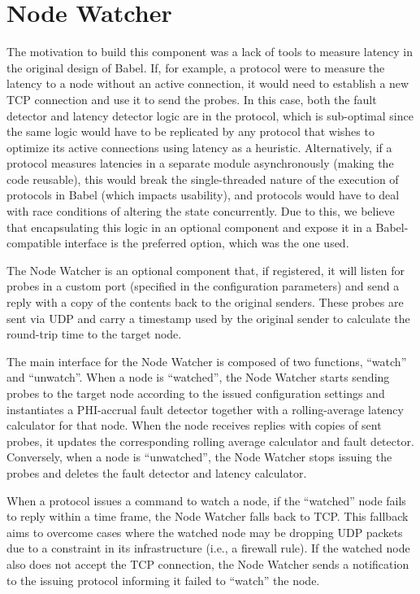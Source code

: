 \section{Node Watcher} \label{sec:Node-Watcher}

The motivation to build this component was a lack of tools to measure latency in the original design of Babel. If, for example, a protocol were to measure the latency to a node without an active connection, it would need to establish a new TCP connection and use it to send the probes. In this case, both the fault detector and latency detector logic are in the protocol, which is sub-optimal since the same logic would have to be replicated by any protocol that wishes to optimize its active connections using latency as a heuristic. Alternatively, if a protocol measures latencies in a separate module asynchronously (making the code reusable), this would break the single-threaded nature of the execution of protocols in Babel (which impacts usability), and protocols would have to deal with race conditions of altering the state concurrently. Due to this, we believe that encapsulating this logic in an optional component and expose it in a Babel-compatible interface is the preferred option, which was the one used.

The Node Watcher is an optional component that, if registered, it will listen for probes in a custom port (specified in the configuration parameters) and send a reply with a copy of the contents back to the original senders. These probes are sent via UDP and carry a timestamp used by the original sender to calculate the round-trip time to the target node.

The main interface for the Node Watcher is composed of two functions, ``watch'' and ``unwatch''. When a node is ``watched'', the Node Watcher starts sending probes to the target node according to the issued configuration settings and instantiates a PHI-accrual fault detector \cite{phi-accrual-fd} together with a rolling-average latency calculator for that node.  When the node receives replies with copies of sent probes, it updates the corresponding rolling average calculator and fault detector. Conversely, when a node is ``unwatched'', the Node Watcher stops issuing the probes and deletes the fault detector and latency calculator.

When a protocol issues a command to watch a node, if the ``watched'' node fails to reply within a time frame, the Node Watcher falls back to TCP. This fallback aims to overcome cases where the watched node may be dropping UDP packets due to a constraint in its infrastructure (i.e., a firewall rule). If the watched node also does not accept the TCP connection, the Node Watcher sends a notification to the issuing protocol informing it failed to ``watch'' the node.

